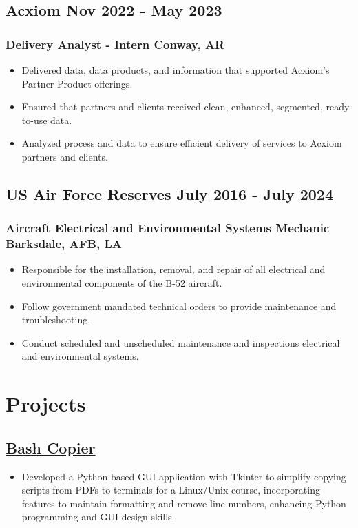 \documentclass[9pt]{article}
\begin{document}
\subsection{Acxiom \hfill Nov 2022 - May 2023}
\subsubsection{Delivery Analyst - Intern \hfill Conway, AR}
\begin{itemize}
    \item Delivered data, data products, and information that supported Acxiom’s Partner Product offerings.
    \item Ensured that partners and clients received clean, enhanced, segmented, ready-to-use data. 
    \item Analyzed process and data to ensure efficient delivery of services to Acxiom partners and clients.
\end{itemize}

\subsection{US Air Force Reserves \hfill July 2016 - July 2024}
\subsubsection{Aircraft Electrical and Environmental Systems Mechanic \hfill Barksdale, AFB, LA}
\begin{itemize}
    \item Responsible for the installation, removal, and repair of all electrical and environmental components of the B-52 aircraft.
    \item Follow government mandated technical orders to provide maintenance and troubleshooting. 
    \item Conduct scheduled and unscheduled maintenance and inspections electrical and environmental systems.
\end{itemize}

\section{Projects}
\subsection{\href{https://github.com/kjgthecoder/bashCopier}{Bash Copier}}
\begin{itemize}
    \item Developed a Python-based GUI application with Tkinter to simplify copying scripts from PDFs to terminals for a Linux/Unix course, incorporating features to maintain formatting and remove line numbers, enhancing Python programming and GUI design skills.
\end{itemize}
\end{document}
